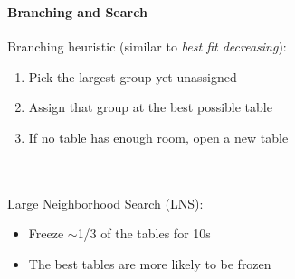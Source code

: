 \documentclass{beamer}
\newcommand{\AutoSectionTitle}{}
\begin{document}


\begin{frame}
  \frametitle{\AutoSectionTitle}
  
  \begin{center}
    
  \end{center}
  
\end{frame}




\begin{frame}
  \frametitle{\AutoSectionTitle}
  
  \begin{center}
    
  \end{center}
  
\end{frame}




\begin{frame}
  \frametitle{\AutoSectionTitle}
  
  \begin{center}
    
  \end{center}
  
\end{frame}




\begin{frame}
  \frametitle{\AutoSectionTitle}
  \framesubtitle{Branching and Search}
  
  Branching heuristic (similar to \emph{best fit decreasing}): \\

  \begin{enumerate}
  \item Pick the largest group yet unassigned \\
  \item Assign that group at the best possible table \\
  \item If no table has enough room, open a new table \\~\\~\\
  \end{enumerate}

  \pause

  Large Neighborhood Search (LNS):

  \begin{itemize}
  \item Freeze $\sim$1/3 of the tables for 10s \\
  \item The best tables are more likely to be frozen
  \end{itemize}
  
\end{frame}
\end{document}

